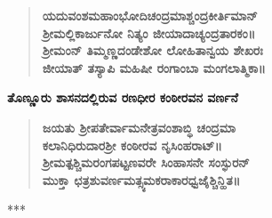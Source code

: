 \begin{verse}
\textbf{ಯದುವಂಶಮಹಾಂಭೋದಿಚಂದ್ರಮಾಶ್ಚಂದ್ರಕೀರ್ತಿಮಾನ್​ \\ ಶ‍್ರೀಮಲ್ಲಿಕಾರ್ಜುನೋ ನಿತ್ಯಂ ಜೀಯಾದಾಚ್ಯಂದ್ರತಾರಕಂ॥}\\ \textbf{ಶ‍್ರೀಮಂನ್​ ತಿಮ್ಮಣ್ಣದಂಡೇಶೋ ಲೋಹಿತಾನ್ವಯ ಶೇಖರಃ \\ ಜೀಯಾತ್​ ತಸ್ಯಾಪಿ ಮಹಿಷೀ ರಂಗಾಂಬಾ ಮಂಗಲಾತ್ಮಿಕಾ॥}
\end{verse}

\noindent
\textbf{ತೊಣ್ಣೂರು ಶಾಸನದಲ್ಲಿರುವ ರಣಧೀರ ಕಂಠೀರವನ ವರ್ಣನೆ}

\begin{verse}
\textbf{ಜಯತು ಶ‍್ರೀಪತೇರ್ವಾಮನೇತ್ರವಂಶಾಬ್ಧಿ ಚಂದ್ರಮಾ \\ ಕಲಾನಿಧಿರುದಾರಶ‍್ರೀ ಕಂಠೀರವ ನೃಸಿಂಹರಾಟ್​॥ \\ ಶ‍್ರೀಮತ್ಪಶ್ಚಿಮರಂಗಪಟ್ಟಣವರೇ ಸಿಂಹಾಸನೇ ಸಂಸ್ಫುರನ್​ \\ ಮುಕ್ತಾ ಛತ್ರಶುವರ್ಣಮತ್ಸ್ಯಮಕರಾಕಾರಧ್ವಜೈಶ್ಚಿನ್ಹಿತ॥}
\end{verse}

\begin{center}
***
\end{center}

\theendnotes

